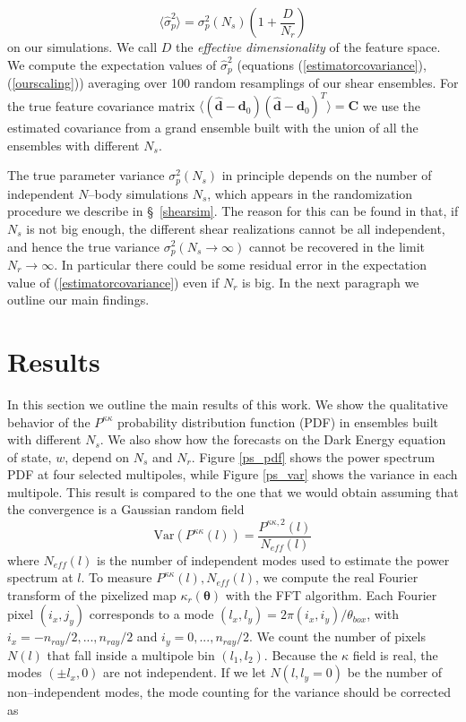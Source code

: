 \documentclass[reprint,aps,prd,superscriptaddress,showkeys,showpacs]{revtex4-1}
\newcommand{\bb}[1]{\mathbf{#1}}
\newcommand{\bbh}[1]{\mathbf{\hat{#1}}}
\newcommand{\h}[1]{\hat{#1}}
\begin{document}
\begin{equation}
\label{ourscaling}
\langle\h{\sigma}_p^2\rangle = \sigma^2_p(N_s)\left(1+\frac{D}{N_r}\right)
\end{equation}
%
on our simulations. We call $D$ the \textit{effective dimensionality} of the feature space. We compute the expectation values of $\h{\sigma}^2_p$ (equations (\ref{estimatorcovariance}),(\ref{ourscaling})) averaging over 100 random resamplings of our shear ensembles. For the true feature covariance matrix $\langle(\bbh{d}-\bb{d}_0)(\bbh{d}-\bb{d}_0)^T\rangle=\bb{C}$ we use the estimated covariance from a grand ensemble built with the union of all the ensembles with different $N_s$. 

The true parameter variance $\sigma^2_p(N_s)$ in principle depends on the number of independent $N$--body simulations $N_s$, which appears in the randomization procedure we describe in \S~\ref{shearsim}. The reason for this can be found in that, if $N_s$ is not big enough, the different shear realizations cannot be all independent, and hence the true variance $\sigma^2_p(N_s\rightarrow\infty)$ cannot be recovered in the limit $N_r\rightarrow\infty$. In particular there could be some residual error in the expectation value of (\ref{estimatorcovariance}) even if $N_r$ is big. In the next paragraph we outline our main findings.
 


\section{Results} 

In this section we outline the main results of this work. We show the qualitative behavior of the $P^{\kappa\kappa}$ probability distribution function (PDF) in ensembles built with different $N_s$. We also show how the forecasts on the Dark Energy equation of state, $w$, depend on $N_s$ and $N_r$. Figure \ref{ps_pdf} shows the power spectrum PDF at four selected multipoles, while Figure \ref{ps_var} shows the variance in each multipole. This result is compared to the one that we would obtain assuming that the convergence is a Gaussian random field
\begin{equation}
\label{gaussianvar}
\mathrm{Var}(P^{\kappa\kappa}(l)) = \frac{P^{\kappa\kappa,2}(l)}{N_{eff}(l)}
\end{equation}
%
where $N_{eff}(l)$ is the number of independent modes used to estimate the power spectrum at $l$. To measure $P^{\kappa\kappa}(l),N_{eff}(l)$, we compute the real Fourier transform of the pixelized map $\kappa_r(\pmb{\theta})$ with the FFT algorithm. Each Fourier pixel $(i_x,j_y)$ corresponds to a mode $(l_x,l_y)=2\pi(i_x,i_y)/\theta_{box}$, with $i_x=-n_{ray}/2,...,n_{ray}/2$ and $i_y=0,...,n_{ray}/2$. We count the number of pixels $N(l)$ that fall inside a multipole bin $(l_1,l_2)$. Because the $\kappa$ field is real, the modes $(\pm l_x,0)$ are not independent. If we let $N(l,l_y=0)$ be the number of non--independent modes, the mode counting for the variance should be corrected as 
\end{document}
